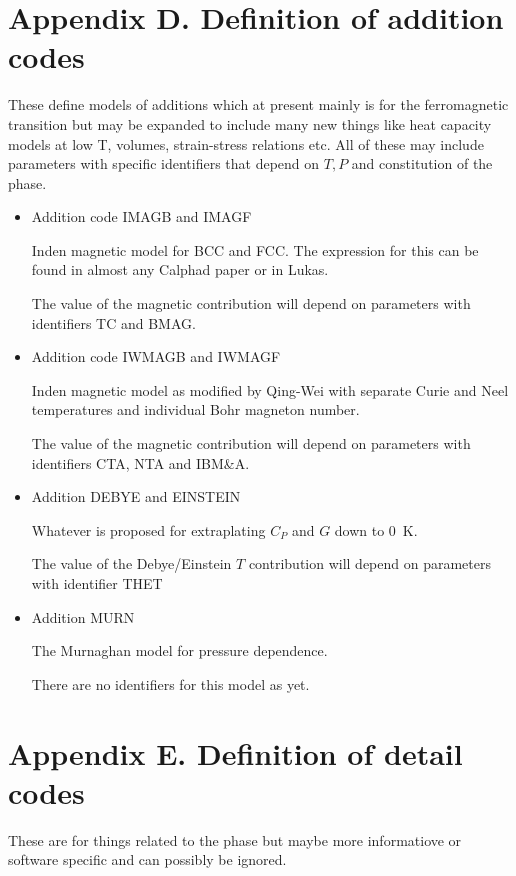 \documentclass[12pt]{article}
\begin{document}
\section{Appendix D.  Definition of addition codes}

These define models of additions which at present mainly is for the
ferromagnetic transition but may be expanded to include many new
things like heat capacity models at low T, volumes, strain-stress
relations etc.  All of these may include parameters with specific
identifiers that depend on $T, P$ and constitution of the phase.

\begin{itemize}
\item Addition code IMAGB and IMAGF

  Inden magnetic model for BCC and FCC.  The expression for this can
  be found in almost any Calphad paper or in Lukas\cite{07Luk}.

  The value of the magnetic contribution will depend on parameters
  with identifiers TC and BMAG.

\item Addition code IWMAGB and IWMAGF

  Inden magnetic model as modified by Qing-Wei with separate Curie and
  Neel temperatures and individual Bohr magneton number.\cite{13Wei}

  The value of the magnetic contribution will depend on parameters
  with identifiers CTA, NTA and IBM\&A.

\item Addition DEBYE and EINSTEIN

  Whatever is proposed for extraplating $C_P$ and $G$ down to 0~K.

  The value of the Debye/Einstein $T$ contribution will depend on parameters
  with identifier THET

\item Addition MURN

  The Murnaghan model for pressure dependence.

  There are no identifiers for this model as yet.

\end{itemize}

\newpage

\section{Appendix E.  Definition of detail codes}

These are for things related to the phase but maybe more informatiove
or software specific and can possibly be ignored.
\end{document}
